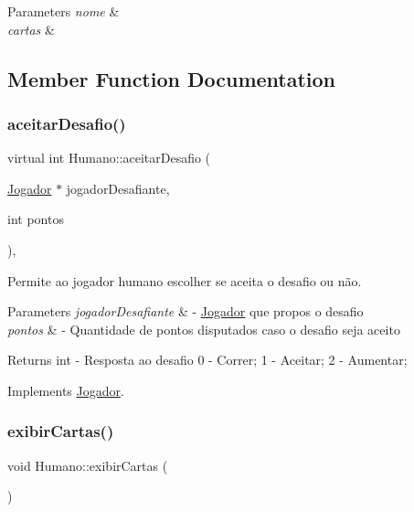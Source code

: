 \begin{DoxyParams}{Parameters}
{\em nome} & \\
\hline
{\em cartas} & \\
\hline
\end{DoxyParams}


\subsection{Member Function Documentation}
\mbox{\label{class_humano_aa1cd4b8c801b73190ad1472f6fc860b1}} 
\subsubsection{\texorpdfstring{aceitarDesafio()}{aceitarDesafio()}}
{\footnotesize\ttfamily virtual int Humano\+::aceitar\+Desafio (\begin{DoxyParamCaption}\item[{\mbox{\hyperlink{class_jogador}{Jogador}} $\ast$}]{jogador\+Desafiante,  }\item[{int}]{pontos }\end{DoxyParamCaption})\hspace{0.3cm}{\ttfamily [override]}, {\ttfamily [virtual]}}



Permite ao jogador humano escolher se aceita o desafio ou não. 


\begin{DoxyParams}{Parameters}
{\em jogador\+Desafiante} & -\/ \mbox{\hyperlink{class_jogador}{Jogador}} que propos o desafio \\
\hline
{\em pontos} & -\/ Quantidade de pontos disputados caso o desafio seja aceito \\
\hline
\end{DoxyParams}
\begin{DoxyReturn}{Returns}
int -\/ Resposta ao desafio 0 -\/ Correr; 1 -\/ Aceitar; 2 -\/ Aumentar; 
\end{DoxyReturn}


Implements \mbox{\hyperlink{class_jogador}{Jogador}}.

\mbox{\label{class_humano_a32767bbf1ad4f6065d18f375341ac00e}} 
\subsubsection{\texorpdfstring{exibirCartas()}{exibirCartas()}}
{\footnotesize\ttfamily void Humano\+::exibir\+Cartas (\begin{DoxyParamCaption}{ }\end{DoxyParamCaption})}



